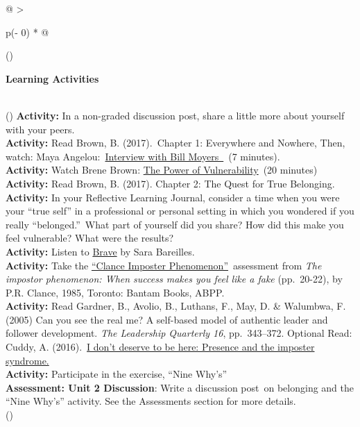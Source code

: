 \documentclass[
]{book}
\begin{document}
\begin{longtable}[]{@{}
  >{\raggedright\arraybackslash}p{(\columnwidth - 0\tabcolsep) * }@{}}
\toprule()
\begin{minipage}[b]{\linewidth}\raggedright
\textbf{Learning Activities}
\end{minipage} \\
\midrule()
\endhead
\textbf{Activity:} In a non-graded discussion post, share a little more about yourself with your peers. \\
\textbf{Activity:} Read Brown, B. (2017).~Chapter 1: Everywhere and Nowhere, Then, watch: Maya Angelou:~\href{http://billmoyers.com/content/conversation-maya-angelou/}{Interview with Bill Moyers~}~(7 minutes). \\
\textbf{Activity:} Watch Brene Brown: \href{https://www.ted.com/talks/brene_brown_on_vulnerability}{The Power of Vulnerability}~(20 minutes) \\
\textbf{Activity:} Read Brown, B. (2017). Chapter 2: The Quest for True Belonging. \\
\textbf{Activity:} In your Reflective Learning Journal, consider a time when you were your ``true self'' in a professional or personal setting in which you wondered if you really ``belonged.''~What part of yourself did you share? How did this make you feel vulnerable? What were the results? \\
\textbf{Activity:} Listen to \href{https://www.youtube.com/watch?v=QUQsqBqxoR4}{Brave} by Sara Bareilles. \\
\textbf{Activity:} Take the \href{https://paulineroseclance.com/pdf/IPscoringtest.pdf}{``Clance Imposter Phenomenon''}~assessment from \emph{The impostor phenomenon: When success makes you feel like a fake} (pp.~20-22), by P.R. Clance, 1985, Toronto: Bantam Books, ABPP. \\
\textbf{Activity:} Read Gardner, B., Avolio, B., Luthans, F., May, D. \& Walumbwa, F. (2005) Can you see the real me? A self-based model of authentic leader and follower development. \emph{The Leadership Quarterly 16}, pp.~343--372. Optional Read: Cuddy, A. (2016).~\href{https://leanin.org/news-inspiration/overcoming-imposter-syndrome-to-reveal-your-presence}{I don't deserve to be here: Presence and the imposter syndrome.} \\
\textbf{Activity:} Participate in the exercise, ``Nine Why's'' \\
\textbf{Assessment: Unit 2 Discussion}: Write a discussion post~on belonging and the ``Nine Why's'' activity. See the Assessments section for more details. \\
\bottomrule()
\end{longtable}
\end{document}
